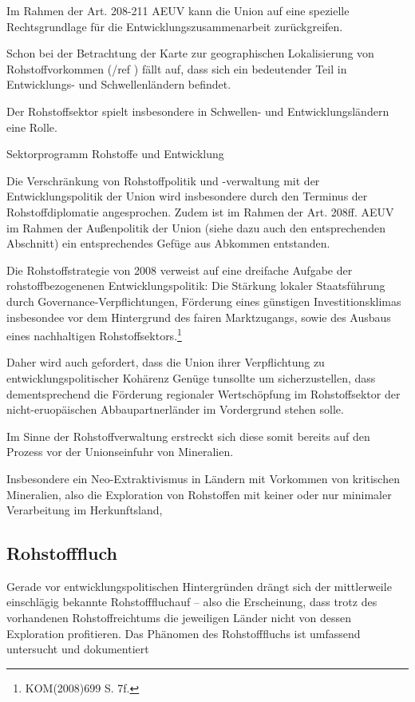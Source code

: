 \documentclass[12pt,a4paper,oneside]{book} %
\begin{document}
Im Rahmen der Art. 208-211 AEUV kann die Union auf eine spezielle Rechtsgrundlage für die Entwicklungszusammenarbeit zurückgreifen.

Schon bei der Betrachtung der Karte zur geographischen Lokalisierung von Rohstoffvorkommen (/ref ) fällt auf, dass sich ein bedeutender Teil in Entwicklungs- und Schwellenländern befindet.

Der Rohstoffsektor spielt insbesondere in Schwellen- und Entwicklungsländern eine Rolle.

Sektorprogramm Rohstoffe und Entwicklung

Die Verschränkung von Rohstoffpolitik und -verwaltung mit der Entwicklungspolitik der Union wird insbesondere durch den Terminus der Rohstoffdiplomatie angesprochen. Zudem ist im Rahmen der Art. 208ff. AEUV im Rahmen der Außenpolitik der Union (siehe dazu auch den entsprechenden Abschnitt) ein entsprechendes Gefüge aus Abkommen entstanden.

Die Rohstoffstrategie von 2008 verweist auf eine dreifache Aufgabe der rohstoffbezogenenen Entwicklungspolitik: Die Stärkung lokaler Staatsführung durch Governance-Verpflichtungen, Förderung eines günstigen Investitionsklimas insbesondee vor dem Hintergrund des fairen Marktzugangs, sowie des Ausbaus eines nachhaltigen Rohstoffsektors.\footnote{KOM(2008)699 S. 7f.}

Daher wird auch gefordert, dass die Union \glqq ihrer Verpflichtung zu entwicklungspolitischer Kohärenz Genüge tun\grqq sollte um sicherzustellen, dass dementsprechend die Förderung regionaler Wertschöpfung im Rohstoffsektor der nicht-eruopäischen Abbaupartnerländer im Vordergrund stehen solle.\autocite[15]{Kueblboeck_2023}

Im Sinne der Rohstoffverwaltung erstreckt sich diese somit bereits auf den Prozess vor der Unionseinfuhr von Mineralien.

Insbesondere ein Neo-Extraktivismus in Ländern mit Vorkommen von kritischen Mineralien, also die Exploration von Rohstoffen mit keiner oder nur minimaler Verarbeitung im Herkunftsland, 


\subsection{Rohstofffluch}

Gerade vor entwicklungspolitischen Hintergründen drängt sich der mittlerweile einschlägig bekannte \glqq Rohstofffluch\grqq auf -- also die Erscheinung, dass trotz des vorhandenen Rohstoffreichtums die jeweiligen Länder nicht von dessen Exploration profitieren. Das Phänomen des Rohstofffluchs ist umfassend untersucht und dokumentiert
\end{document}
